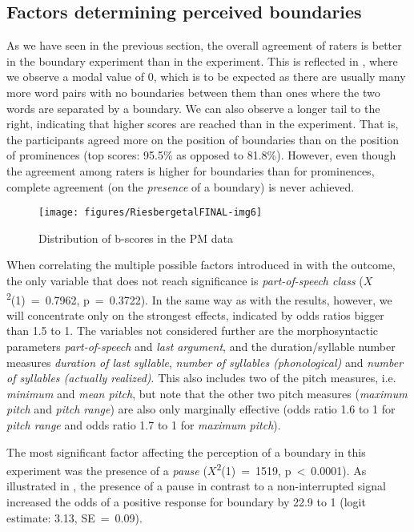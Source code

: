 \documentclass[output=paper
,modfonts
,nonflat]{langsci/langscibook}
\begin{document}
\subsection{\label{s:riesberg:4.2}Factors determining perceived boundaries}

As we have seen in the previous section, the overall agreement of raters is better in the boundary experiment than in the  experiment. This is reflected in , where we observe a modal value of 0, which is to be expected as there are usually many more word pairs with no boundaries between them than ones where the two words are separated by a boundary. We can also observe a longer tail to the right, indicating that higher scores are reached than in the  experiment. That is, the participants agreed more on the position of boundaries than on the position of prominences (top scores: 95.5\% as opposed to 81.8\%). However, even though the agreement among raters is higher for boundaries than for prominences, complete agreement (on the \textit{presence} of a boundary) is never achieved.

\begin{figure}
	\texttt{[image: figures/RiesbergetalFINAL-img6]}
	\caption{Distribution of b-scores in the PM data}
	\label{f:riesberg:6}
\end{figure}

When correlating the multiple possible factors introduced in  with the outcome, the only variable that does not reach significance is \textit{part-of-speech class} (\textit{$X$}\textsuperscript{2}(1)~=~0.7962, p~=~0.3722). In the same way as with the  results, however, we will concentrate only on the strongest effects, indicated by odds ratios bigger than 1.5 to 1. The variables not considered further are the morphosyntactic parameters \textit{part-of-speech} and \textit{last argument}, and the duration/syllable number measures \textit{duration of last syllable}, \textit{number of syllables (phonological)} and \textit{number of syllables (actually realized)}. This also includes two of the pitch measures, i.e. \textit{minimum} and \textit{mean pitch}, but note that the other two pitch measures (\textit{maximum pitch} and \textit{pitch range}) are also only marginally effective (odds ratio 1.6 to 1 for \textit{pitch range} and odds ratio 1.7 to 1 for \textit{maximum} \textit{pitch}). 

The most significant factor affecting the perception of a boundary in this experiment was the presence of a \textit{pause} (\textit{$X$}\textsuperscript{2}(1)~=~1519, p~<~0.0001). As illustrated in , the presence of a pause in contrast to a non-interrupted signal increased the odds of a positive response for boundary by 22.9 to 1 (logit estimate: 3.13, SE~=~0.09).
\end{document}
